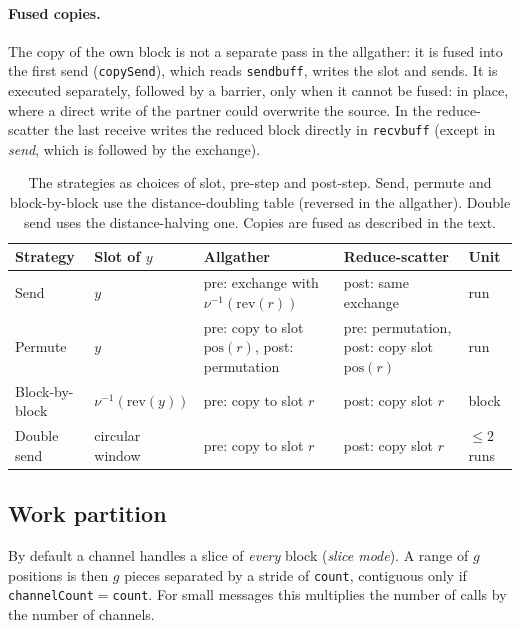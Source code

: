 \paragraph{Fused copies.}
The copy of the own block is not a separate pass in the allgather: it is fused into the first send (\texttt{copySend}), which reads \texttt{sendbuff}, writes the slot and sends.
It is executed separately, followed by a barrier, only when it cannot be fused: in place, where a direct write of the partner could overwrite the source.
In the reduce-scatter the last receive writes the reduced block directly in \texttt{recvbuff} (except in \emph{send}, which is followed by the exchange).

\begin{table}[t]
\centering
\footnotesize
\setlength{\tabcolsep}{4pt}
\caption{The strategies as choices of slot, pre-step and post-step. Send, permute and block-by-block use the distance-doubling table (reversed in the allgather). Double send uses the distance-halving one. Copies are fused as described in the text.}
\label{tab:bfly-strategies}
\begin{tabularx}{\linewidth}{@{}l l X X l@{}}
\toprule
Strategy & Slot of $y$ & Allgather & Reduce-scatter & Unit \\
\midrule
Send & $y$ & pre: exchange with $\nu^{-1}(\mathrm{rev}(r))$ & post: same exchange & run \\
Permute & $y$ & pre: copy to slot $\mathrm{pos}(r)$, post: permutation & pre: permutation, post: copy slot $\mathrm{pos}(r)$ & run \\
Block-by-block & $\nu^{-1}(\mathrm{rev}(y))$ & pre: copy to slot $r$ & post: copy slot $r$ & block \\
Double send & circular window & pre: copy to slot $r$ & post: copy slot $r$ & $\le2$ runs \\
\bottomrule
\end{tabularx}
\end{table}

\subsection{Work partition}\label{sec:bfly-pos}

By default a channel handles a slice of \emph{every} block (\emph{slice mode}).
A range of $g$ positions is then $g$ pieces separated by a stride of \texttt{count}, contiguous only if \texttt{channelCount}$=$\texttt{count}.
For small messages this multiplies the number of calls by the number of channels.

